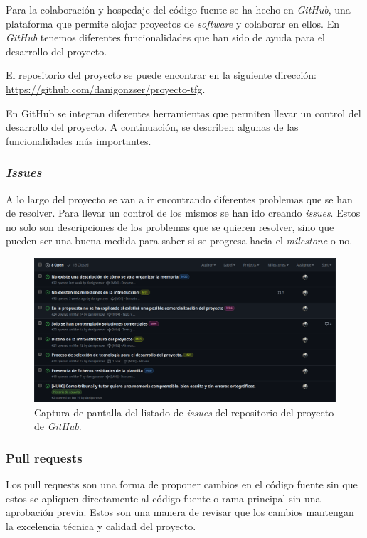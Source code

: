 Para la colaboración y hospedaje del código fuente se ha hecho en \textit{GitHub}, una plataforma que permite alojar proyectos de \textit{software} y colaborar en ellos. En \textit{GitHub} tenemos diferentes funcionalidades que han sido de ayuda para el desarrollo del proyecto.

El repositorio del proyecto se puede encontrar en la siguiente dirección: \url{https://github.com/danigonzser/proyecto-tfg}.

En GitHub se integran diferentes herramientas que permiten llevar un control del desarrollo del proyecto. A continuación, se describen algunas de las funcionalidades más importantes.

\subsubsection{\textit{Issues}}

A lo largo del proyecto se van a ir encontrando diferentes problemas que se han de resolver. Para llevar un control de los mismos se han ido creando \textit{issues}. Estos no solo son descripciones de los problemas que se quieren resolver, sino que pueden ser una buena medida para saber si se progresa hacia el \textit{milestone} o no.

\begin{figure}[H]
    \caption{Captura de pantalla del listado de \textit{issues} del repositorio del proyecto de \textit{GitHub}.}
    \centering
    \vspace*{0.5cm}
    \includegraphics[scale=0.2]{figuras/github_issues.png}
\end{figure}

\subsubsection{Pull requests}

Los pull requests son una forma de proponer cambios en el código fuente sin que estos se apliquen directamente al código fuente o rama principal sin una aprobación previa. Estos son una manera de revisar que los cambios mantengan la excelencia técnica y calidad del proyecto.

